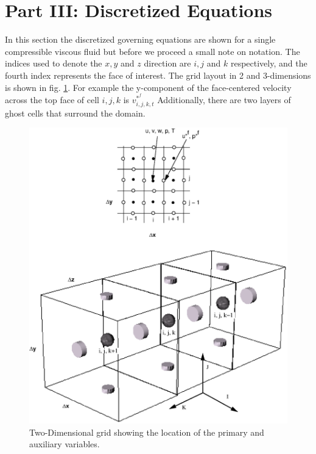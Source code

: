 \documentclass[fleqn]{article}
\begin{document}
{\section{\textsf{Part III: Discretized Equations}}
In this section the discretized governing equations are shown for a single
compressible viscous fluid but before we proceed a small note on notation.
The indices used to denote the $x, y$ and $z$ direction are $i, j$ and
$k$ respectively, and the fourth index represents the face of interest.
The grid layout in 2 and 3-dimensions is shown in fig. \ref{fig:2dgrid}.
For example the y-component of the face-centered velocity across the top
face of cell ${i, j, k}$ is $v^{*^{f}}_{i,j,k,t}$  Additionally, there are
two layers of ghost cells that surround the domain.
%
\begin{figure}
\center
\includegraphics[scale=.85]{2dgrid.eps}
\caption{Two-Dimensional grid showing the location of the primary and auxiliary variables.}
\label{fig:2dgrid}
\end{figure}
%
%
%
%
}
\end{document}
